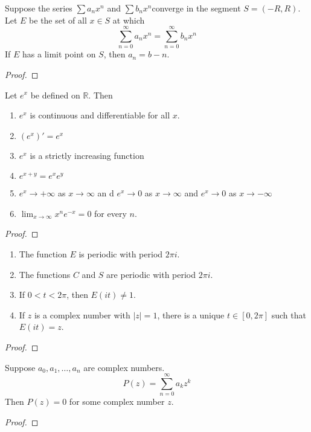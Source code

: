 \begin{theorem}
	Suppose the series $\sum a_n x^n$ and $\sum b_n x^n$converge in the segment $S = (-R,R)$.
	Let $E$ be the set of all $x \in S$ at which
	\[ \sum_{n = 0}^\infty a_n x^n = \sum_{n = 0}^\infty b_n x^n \]
	If $E$ has a limit point on $S$, then $a_n = b-n$.
\end{theorem}
\begin{proof}
\end{proof}

\begin{theorem}
	Let $e^x$ be defined on $\mathbb{R}$.
	Then
	\begin{enumerate}
		\item $e^x$ is continuous and differentiable for all $x$.
		\item $(e^x)' = e^x$
		\item $e^x$ is a strictly increasing function
		\item $e^{x+y} = e^x e^y$
		\item $e^x \to +\infty$ as $x \to \infty$ an d $e^x \to 0$ as $x \to \infty$ and $e^x \to 0$ as $x \to -\infty$
		\item $\displaystyle \lim_{x \to \infty} x^ne^{-x} = 0$ for every $n$.
	\end{enumerate}
\end{theorem}
\begin{proof}
\end{proof}

\begin{theorem}
	\begin{enumerate}
		\item The function $E$ is periodic with period $2\pi i$.
		\item The functions $C$ and $S$ are periodic with period $2\pi i$.
		\item If $0 < t < 2\pi$, then $E(it) \ne 1$.
		\item If $z$ is a complex number with $|z| =1$, there is a unique $t \in [0,2\pi]$ such that $E(it) = z$.
	\end{enumerate}
\end{theorem}
\begin{proof}
\end{proof}

\begin{theorem}
	Suppose $a_0,a_1,\dots,a_n$ are complex numbers.
	\[ P(z) = \sum_{n=0}^\infty a_k z^k \]
	Then $P(z) = 0$ for some complex number $z$.
\end{theorem}
\begin{proof}
\end{proof}


